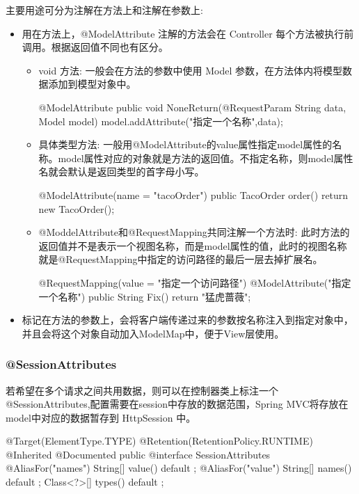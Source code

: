 主要用途可分为注解在方法上和注解在参数上:
\begin{itemize}
    \item 用在方法上，@ModelAttribute 注解的方法会在 Controller 每个方法被执行前调用。根据返回值不同也有区分。
    \begin{itemize}
        \item void 方法: 一般会在方法的参数中使用 Model 参数，在方法体内将模型数据添加到模型对象中。
\begin{Java}
@ModelAttribute 
public void NoneReturn(@RequestParam String data, Model model) { 
    model.addAttribute("指定一个名称",data); 
}
\end{Java}
        \item 具体类型方法: 一般用@ModelAttribute的value属性指定model属性的名称。model属性对应的对象就是方法的返回值。不指定名称，则model属性名就会默认是返回类型的首字母小写。
\begin{Java}
@ModelAttribute(name = "tacoOrder")
public TacoOrder order() {
    return new TacoOrder();
}
\end{Java}
        \item @ModdelAttribute和@RequestMapping共同注解一个方法时: 此时方法的返回值并不是表示一个视图名称，而是model属性的值，此时的视图名称就是@RequestMapping中指定的访问路径的最后一层去掉扩展名。
\begin{Java}
@RequestMapping(value = "指定一个访问路径") 
@ModelAttribute("指定一个名称") 
public String Fix() { 
    return "猛虎蔷薇"; 
} 
\end{Java}
    \end{itemize}
    \item 标记在方法的参数上，会将客户端传递过来的参数按名称注入到指定对象中，并且会将这个对象自动加入ModelMap中，便于View层使用。
\end{itemize}

\subsubsection{@SessionAttributes}

若希望在多个请求之间共用数据，则可以在控制器类上标注一个 @SessionAttributes,配置需要在session中存放的数据范围，Spring MVC将存放在model中对应的数据暂存到 HttpSession 中。

\begin{Java}
@Target({ElementType.TYPE})
@Retention(RetentionPolicy.RUNTIME)
@Inherited
@Documented
public @interface SessionAttributes {
    @AliasFor("names")
    String[] value() default {};
    @AliasFor("value")
    String[] names() default {};
    Class<?>[] types() default {};
}
\end{Java}








\newpage
